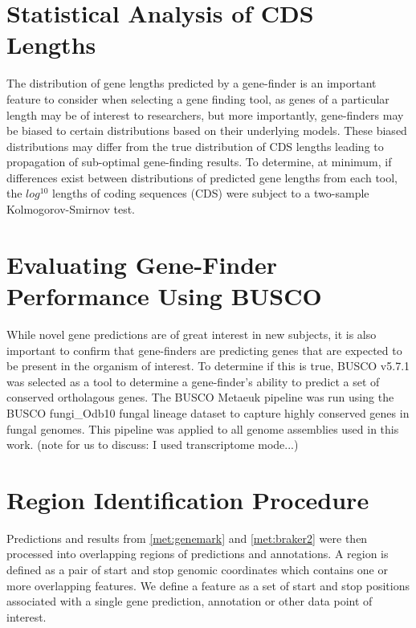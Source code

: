 \section{Statistical Analysis of CDS Lengths}
\label{met:cds-stats}
The distribution of gene lengths predicted by a gene-finder is an
important feature to consider when selecting a gene finding tool, as
genes of a particular length may be of interest to researchers, but
more importantly, gene-finders may be biased to certain distributions
based on their underlying models. These biased distributions may
differ from the true distribution of CDS lengths leading to
propagation of sub-optimal gene-finding results. To determine, at
minimum, if differences exist between distributions of predicted gene
lengths from each tool, the $log^10$ lengths of coding sequences (CDS)
were subject to a two-sample Kolmogorov-Smirnov test\cite{ref1}.

\section{Evaluating Gene-Finder Performance Using BUSCO}

While novel gene predictions are of great interest in new subjects, it
is also important to confirm that gene-finders are predicting genes
that are expected to be present in the organism of
interest\cite{https://doi.org/10.1002/cpz1.323}. To determine if this
is true, BUSCO v5.7.1\cite{10.1093/bioinformatics/btv351} was selected
as a tool to determine a gene-finder's ability to predict a set of
conserved ortholagous genes. The BUSCO Metaeuk pipeline was run using
the BUSCO fungi\_Odb10 fungal lineage dataset to capture highly
conserved genes in fungal genomes. This pipeline was applied to all
genome assemblies used in this work. (note for us to discuss: I used
transcriptome mode...)

\section{Region Identification Procedure}
\label{section:region-met}

Predictions and results from \ref{met:genemark} and \ref{met:braker2}
were then processed into overlapping regions of predictions and
annotations. A region is defined as a pair of start and stop genomic
coordinates which contains one or more overlapping features. We define
a feature as a set of start and stop positions associated with a
single gene prediction, annotation or other data point of interest.

